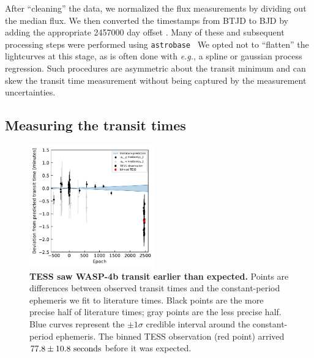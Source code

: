 \documentclass[12pt,twocolumn,tighten]{aastex62}
\begin{document}
After ``cleaning'' the data, we normalized the flux measurements by
dividing out the median flux.  We then converted the timestamps from
BTJD to BJD by adding the appropriate 2457000 day offset
\citep{tess_data_product_description_2018}.  Many of these and
subsequent processing steps were performed using
\texttt{astrobase}~\citep{bhatti_astrobase_2018} We opted not to
``flatten'' the lightcurves at this stage, as is often done with {\it
e.g.}, a spline or gaussian process regression.  Such procedures are
asymmetric about the transit minimum and can skew the transit time
measurement without being captured by the measurement uncertainties.



\subsection{Measuring the transit times}
\label{sec:measurement}

\begin{figure}[t]
    \begin{center}
        \leavevmode
        \includegraphics[width=0.48\textwidth]{f2.pdf}
    \end{center}
    \vspace{-0.5cm}
    \caption{
        {\bf TESS saw WASP-4b transit earlier than expected.}
        Points are differences between observed transit times and the
        constant-period ephemeris we fit to literature times.  Black
        points are the more precise half of literature times; gray
        points are the less precise half.  Blue curves represent the
        $\pm 1\sigma$ credible interval around the constant-period
        ephemeris.  The binned TESS observation (red point) arrived
        $77.8 \pm 10.8\ {\rm seconds}$ before it was expected.
        \label{fig:arrived_early}
    }
\end{figure}
\end{document}
